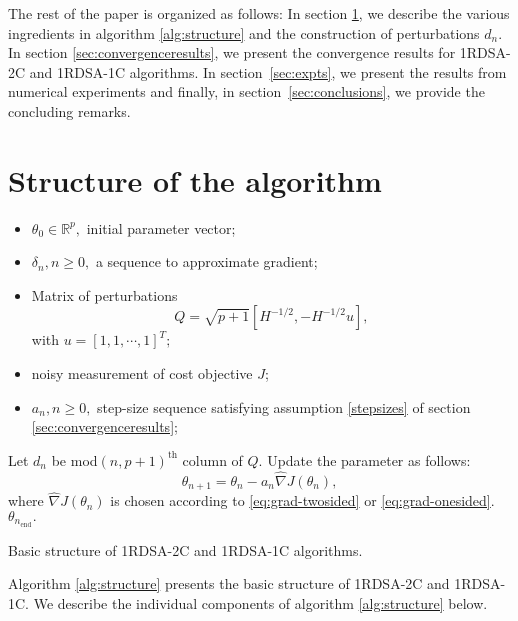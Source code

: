 \documentclass[letterpaper, 10 pt, conference]{ieeeconf}  %
\begin{document}
The rest of the paper is organized as follows: In section \ref{sec:algo}, we
describe the various ingredients in algorithm \ref{alg:structure} and the construction
of perturbations $d_n$.
In section \ref{sec:convergenceresults}, 
we present the convergence results for 1RDSA-2C and 1RDSA-1C algorithms.
In section~\ref{sec:expts}, we present the results from numerical experiments and finally, 
in section~\ref{sec:conclusions}, we provide the concluding remarks.

\section{Structure of the algorithm}
\label{sec:algo}
\begin{algorithm}[t]
\begin{algorithmic}
\begin{itemize}
 \item $\theta_0 \in \mathbb{R}^p,$ initial parameter vector;
 \item $\delta_n, n \geq 0,$ a sequence to approximate gradient;
 \item Matrix of perturbations $$Q=\sqrt{p+1}[H^{-1/2},-H^{-1/2}u],$$ 
 with $u=[1,1,\cdots,1]^T;$
 \item noisy measurement of cost objective $J$;
 \item $a_n, n \geq 0,$ step-size sequence satisfying assumption \ref{stepsizes} of 
 section \ref{sec:convergenceresults};
\end{itemize}

	\State Let $d_n$ be mod$(n,p+1)^{\text{th}}$ column of $Q$. 
	\State Update the parameter as follows:
  \begin{equation}
  \theta_{n+1}=\theta_n-a_n \widehat\nabla J(\theta_n), \label{eq:algo}
  \end{equation}
where $\widehat\nabla J(\theta_n)$ is chosen according to \eqref{eq:grad-twosided} 
or \eqref{eq:grad-onesided}. 
\EndFor
{} $\theta_{n_{\text{end}}}.$
\end{algorithmic}
\caption{Basic structure of 1RDSA-2C and 1RDSA-1C algorithms.}
\label{alg:structure}
\end{algorithm}

Algorithm \ref{alg:structure} presents the basic structure of 
1RDSA-2C and 1RDSA-1C. We describe the individual 
components of algorithm \ref{alg:structure} below.
\end{document}
